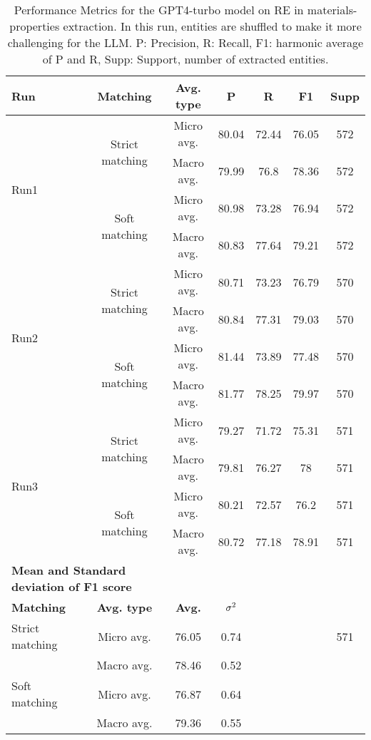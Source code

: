\begin{table}[htbp]
    \small
    \centering
    \caption{Performance Metrics for the GPT4-turbo model on RE in materials-properties extraction. In this run, entities are shuffled to make it more challenging for the LLM. P: Precision, R: Recall, F1: harmonic average of P and R, Supp: Support, number of extracted entities.}
    \begin{tabular}{lcccccc}
        \toprule
        \textbf{Run} & \textbf{Matching} & \textbf{Avg. type} & \textbf{P} & \textbf{R} & \textbf{F1} & \textbf{Supp} \\
        \midrule
        \multirow{4}{*}{Run1} & \multirow{2}{*}{Strict matching} & Micro avg. & 80.04 & 72.44 & 76.05 & 572 \\
        & & Macro avg. & 79.99 & 76.8 & 78.36 & 572 \\
        \cmidrule{2-7}
        & \multirow{2}{*}{Soft matching} & Micro avg. & 80.98 & 73.28 & 76.94 & 572 \\
        & & Macro avg. & 80.83 & 77.64 & 79.21 & 572 \\
        \midrule
        \multirow{4}{*}{Run2} & \multirow{2}{*}{Strict matching} & Micro avg. & 80.71 & 73.23 & 76.79 & 570 \\
        & & Macro avg. & 80.84 & 77.31 & 79.03 & 570 \\
        \cmidrule{2-7}
        & \multirow{2}{*}{Soft matching} & Micro avg. & 81.44 & 73.89 & 77.48 & 570 \\
        & & Macro avg. & 81.77 & 78.25 & 79.97 & 570 \\
        \midrule
        \multirow{4}{*}{Run3} & \multirow{2}{*}{Strict matching} & Micro avg. & 79.27 & 71.72 & 75.31 & 571 \\
        & & Macro avg. & 79.81 & 76.27 & 78 & 571 \\
        \cmidrule{2-7}
        & \multirow{2}{*}{Soft matching} & Micro avg. & 80.21 & 72.57 & 76.2 & 571 \\
        & & Macro avg. & 80.72 & 77.18 & 78.91 & 571 \\
        \midrule
        \multicolumn{2}{l}{\textbf{Mean and Standard deviation of F1 score}} & & & & & \\
        \midrule
        \textbf{Matching} & \textbf{Avg. type} & \textbf{Avg.} & $\sigma\textsuperscript{2}$ & & & \\
        Strict matching & Micro avg. & 76.05 & 0.74 & & & 571 \\
        & Macro avg. & 78.46 & 0.52 & & & \\
        Soft matching & Micro avg. & 76.87 & 0.64 & & & \\
        & Macro avg. & 79.36 & 0.55 & & \\
        \bottomrule
    \end{tabular}
\end{table}


